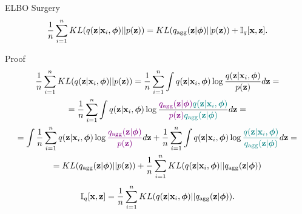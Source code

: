 \documentclass{beamer}
\begin{document}
\begin{frame}{ELBO Surgery}
		\vspace{-0.4cm}
		\[
		    \frac{1}{n} \sum_{i=1}^n KL(q(\mathbf{z} | \mathbf{x}_i, \boldsymbol{\phi}) || p(\mathbf{z})) = KL(q_{\text{agg}}(\mathbf{z} | \boldsymbol{\phi}) || p(\mathbf{z})) + \mathbb{I}_q [\mathbf{x}, \mathbf{z}].
		\]
		\vspace{-0.3cm}
	\begin{block}{Proof}
		\vspace{-0.5cm}
		{\footnotesize
		\begin{multline*}
		    \frac{1}{n} \sum_{i=1}^n KL(q(\mathbf{z} | \mathbf{x}_i, \boldsymbol{\phi}) || p(\mathbf{z})) = \frac{1}{n} \sum_{i=1}^n \int q(\mathbf{z} | \mathbf{x}_i, \boldsymbol{\phi}) \log \frac{q(\mathbf{z} | \mathbf{x}_i, \boldsymbol{\phi})}{p(\mathbf{z})} d \mathbf{z} = \\
		    = \frac{1}{n} \sum_{i=1}^n \int q(\mathbf{z} | \mathbf{x}_i, \boldsymbol{\phi}) \log \frac{{\color{violet}q_{\text{agg}}(\mathbf{z} | \boldsymbol{\phi})} {\color{teal}q(\mathbf{z} | \mathbf{x}_i, \boldsymbol{\phi})}}{{\color{violet}p(\mathbf{z})} {\color{teal}q_{\text{agg}}(\mathbf{z} | \boldsymbol{\phi})}} d \mathbf{z} = \\
		    = \int \frac{1}{n} \sum_{i=1}^n  q(\mathbf{z} | \mathbf{x}_i, \boldsymbol{\phi}) \log {\color{violet}\frac{q_{\text{agg}}(\mathbf{z}| \boldsymbol{\phi})}{p(\mathbf{z})}} d \mathbf{z}
		    + \frac{1}{n}\sum_{i=1}^n \int q(\mathbf{z} | \mathbf{x}_i, \boldsymbol{\phi}) \log {\color{teal}\frac{q(\mathbf{z}| \mathbf{x}_i, \boldsymbol{\phi})}{q_{\text{agg}}(\mathbf{z}| \boldsymbol{\phi})}} d \mathbf{z} = \\
		    = KL (q_{\text{agg}}(\mathbf{z} | \boldsymbol{\phi}) || p(\mathbf{z})) + \frac{1}{n}\sum_{i=1}^n KL(q(\mathbf{z} | \mathbf{x}_i, \boldsymbol{\phi}) || q_{\text{agg}}(\mathbf{z} | \boldsymbol{\phi}))
		\end{multline*}
		}
		\vspace{-0.4cm}
		\[
			\mathbb{I}_{q} [\mathbf{x}, \mathbf{z}] = \frac{1}{n}\sum_{i=1}^n KL(q(\mathbf{z} | \mathbf{x}_i, \boldsymbol{\phi}) || q_{\text{agg}}(\mathbf{z} | \boldsymbol{\phi})).
		\]
	\end{block}

\end{frame}
\end{document}
